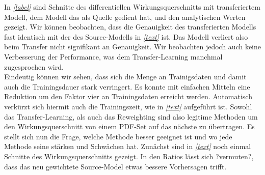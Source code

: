 In \textit{\autoref{label}} sind Schnitte des differentiellen Wirkungsquerschnitts mit transferiertem Modell, dem Modell das als Quelle gedient hat, und den analytischen Werten gezeigt. Wir können beobachten, dass die Genauigkeit des transferierten Modells fast identisch mit der des Source-Modells in \textit{\autoref{text}} ist. Das Modell verliert also beim Transfer nicht signifikant an Genauigkeit. Wir beobachten jedoch auch keine Verbesserung der Performance, was dem Transfer-Learning manchmal zugesprochen wird.  \\
Eindeutig können wir sehen, dass sich die Menge an Trainigsdaten und damit auch die Trainingsdauer stark verringert. Es konnte mit einfachen Mitteln eine Reduktion um den Faktor vier an Trainingsdaten erreicht werden. Automatisch verkürzt sich hiermit auch die Trainingszeit, wie in \textit{\autoref{text}} aufgeführt ist. %
Sowohl das Transfer-Learning, als auch das Reweighting sind also legitime Methoden um den Wirkungsquerschnitt von einem PDF-Set auf das nächste zu übertragen. Es stellt sich nun die Frage, welche Methode besser geeignet ist und wo jede Methode seine stärken und Schwächen hat. Zunächst sind in \textit{\autoref{text}} noch einmal Schnitte des Wirkungsquerschnitts gezeigt. In den Ratios lässt sich ?vermuten?, dass das neu gewichtete Source-Model etwas bessere Vorhersagen trifft. 
 
